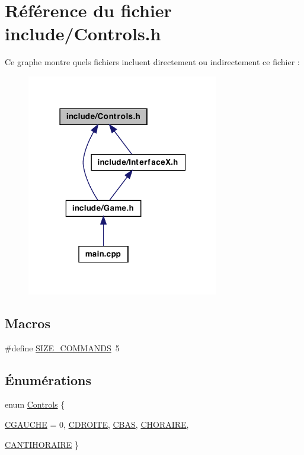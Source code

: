\hypertarget{a00021}{
\section{Référence du fichier include/Controls.h}
\label{a00021}
}
Ce graphe montre quels fichiers incluent directement ou indirectement ce fichier :
\nopagebreak
\begin{figure}[H]
\begin{center}
\leavevmode
\includegraphics[width=238pt]{a00047}
\end{center}
\end{figure}
\subsection*{Macros}
\begin{DoxyCompactItemize}
\item 
\#define \hyperlink{a00021_a7feb75c30d4fd29d9d2480bce84ad249}{SIZE\_\-COMMANDS}~5
\end{DoxyCompactItemize}
\subsection*{Énumérations}
\begin{DoxyCompactItemize}
\item 
enum \hyperlink{a00021_a949b4a8624f2b4343a97e2f265d19aa7}{Controls} \{ \par
\hyperlink{a00021_a949b4a8624f2b4343a97e2f265d19aa7a53ad5f5d4c4d1d56261b0f143325675d}{CGAUCHE} = 0, 
\hyperlink{a00021_a949b4a8624f2b4343a97e2f265d19aa7a2b00be84524f86987e100caa815f8eaa}{CDROITE}, 
\hyperlink{a00021_a949b4a8624f2b4343a97e2f265d19aa7a8b83df918bd05d18b7c16106d0015fac}{CBAS}, 
\hyperlink{a00021_a949b4a8624f2b4343a97e2f265d19aa7a3d5dc97311e9ac8b6031e4267e10520c}{CHORAIRE}, 
\par
\hyperlink{a00021_a949b4a8624f2b4343a97e2f265d19aa7a09bc5379d222ea3f01750511bc2926ff}{CANTIHORAIRE}
 \}
\end{DoxyCompactItemize}


